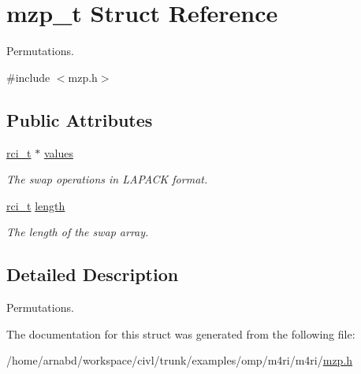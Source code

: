 \hypertarget{structmzp__t}{}\section{mzp\+\_\+t Struct Reference}
\label{structmzp__t}


Permutations.  




{\ttfamily \#include $<$mzp.\+h$>$}

\subsection*{Public Attributes}
\begin{DoxyCompactItemize}
\item 
\hypertarget{structmzp__t_ac5d235af38700421f78eea8e215176b8}{}\hyperlink{misc_8h_a03971b7935a6bc6fb77e74988850a136}{rci\+\_\+t} $\ast$ \hyperlink{structmzp__t_ac5d235af38700421f78eea8e215176b8}{values}\label{structmzp__t_ac5d235af38700421f78eea8e215176b8}

\begin{DoxyCompactList}\small\item\em The swap operations in L\+A\+P\+A\+C\+K format. \end{DoxyCompactList}\item 
\hypertarget{structmzp__t_af3aa5f0301944364ef3350e6af8a3937}{}\hyperlink{misc_8h_a03971b7935a6bc6fb77e74988850a136}{rci\+\_\+t} \hyperlink{structmzp__t_af3aa5f0301944364ef3350e6af8a3937}{length}\label{structmzp__t_af3aa5f0301944364ef3350e6af8a3937}

\begin{DoxyCompactList}\small\item\em The length of the swap array. \end{DoxyCompactList}\end{DoxyCompactItemize}


\subsection{Detailed Description}
Permutations. 

The documentation for this struct was generated from the following file\+:\begin{DoxyCompactItemize}
\item 
/home/arnabd/workspace/civl/trunk/examples/omp/m4ri/m4ri/\hyperlink{mzp_8h}{mzp.\+h}\end{DoxyCompactItemize}
